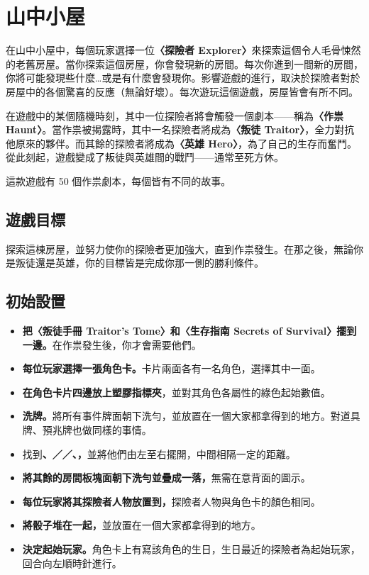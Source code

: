 
\section{山中小屋} \label{sec:intro}

在山中小屋中，每個玩家選擇一位\textbf{〈探險者 Explorer〉}來探索這個令人毛骨悚然的老舊房屋。當你探索這個房屋，你會發現新的房間。每次你進到一間新的房間，你將可能發現些什麼…或是有什麼會發現你。影響遊戲的進行，取決於探險者對於房屋中的各個驚喜的反應（無論好壞）。每次遊玩這個遊戲，房屋皆會有所不同。

在遊戲中的某個隨機時刻，其中一位探險者將會觸發一個劇本——稱為\textbf{〈作祟 Haunt〉}。當作祟被揭露時，其中一名探險者將成為\textbf{〈叛徒 Traitor〉}，全力對抗他原來的夥伴。而其餘的探險者將成為\textbf{〈英雄 Hero〉}，為了自己的生存而奮鬥。從此刻起，遊戲變成了叛徒與英雄間的戰鬥——通常至死方休。

這款遊戲有 50 個作祟劇本，每個皆有不同的故事。


\subsection{遊戲目標}

探索這棟房屋，並努力使你的探險者更加強大，直到作祟發生。在那之後，無論你是叛徒還是英雄，你的目標皆是完成你那一側的勝利條件。


\subsection{初始設置}

\begin{itemize}
  \item \textbf{把〈叛徒手冊 Traitor's Tome〉和〈生存指南 Secrets of Survival〉擺到一邊。}在作祟發生後，你才會需要他們。
  \item \textbf{每位玩家選擇一張角色卡。}卡片兩面各有一名角色，選擇其中一面。
  \item \textbf{在角色卡片四邊放上塑膠指標夾}，並對其角色各屬性的綠色起始數值。
  \item \textbf{洗牌。}將所有事件牌面朝下洗勻，並放置在一個大家都拿得到的地方。對道具牌、預兆牌也做同樣的事情。
  \item 找到\textbf{、／／、，}並將他們由左至右擺開，中間相隔一定的距離。
  \item \textbf{將其餘的房間板塊面朝下洗勻並疊成一落，}無需在意背面的圖示。
  \item \textbf{每位玩家將其探險者人物放置到，}探險者人物與角色卡的顏色相同。
  \item \textbf{將骰子堆在一起，}並放置在一個大家都拿得到的地方。
  \item \textbf{決定起始玩家。}角色卡上有寫該角色的生日，生日最近的探險者為起始玩家，回合向左順時針進行。
\end{itemize}
